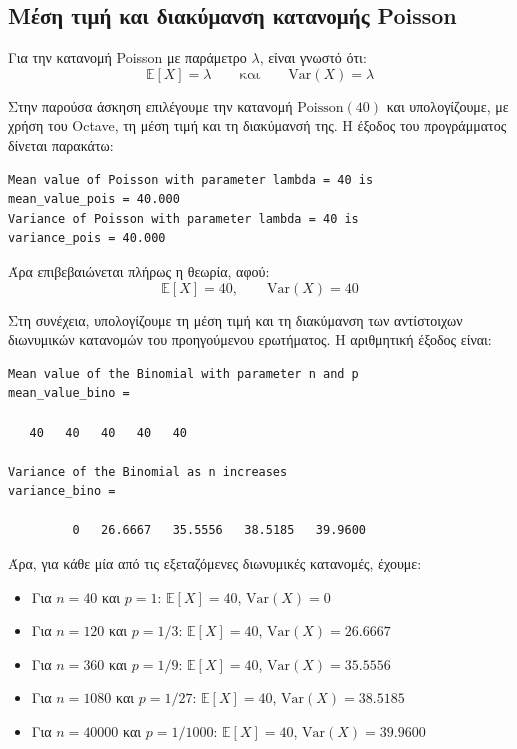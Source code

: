 \documentclass{article}
\begin{document}
\subsection{Μέση τιμή και διακύμανση κατανομής Poisson}

Για την κατανομή Poisson με παράμετρο \(\lambda\), είναι γνωστό ότι:
\begin{equation}
    \mathbb{E}[X] = \lambda
    \qquad \text{και} \qquad
    \mathrm{Var}(X) = \lambda
\end{equation}

Στην παρούσα άσκηση επιλέγουμε την κατανομή \(\mathrm{Poisson}(40)\) και υπολογίζουμε, με
χρήση του Octave, τη μέση τιμή και τη διακύμανσή της. Η έξοδος του προγράμματος δίνεται
παρακάτω:

\begin{verbatim}
Mean value of Poisson with parameter lambda = 40 is
mean_value_pois = 40.000
Variance of Poisson with parameter lambda = 40 is
variance_pois = 40.000
\end{verbatim}

Άρα επιβεβαιώνεται πλήρως η θεωρία, αφού:
\[
\mathbb{E}[X] = 40,
\qquad
\mathrm{Var}(X) = 40
\]

Στη συνέχεια, υπολογίζουμε τη μέση τιμή και τη διακύμανση των αντίστοιχων διωνυμικών
κατανομών του προηγούμενου ερωτήματος. Η αριθμητική έξοδος είναι:

\begin{verbatim}
Mean value of the Binomial with parameter n and p
mean_value_bino =

   40   40   40   40   40

Variance of the Binomial as n increases
variance_bino =

         0   26.6667   35.5556   38.5185   39.9600
\end{verbatim}

Άρα, για κάθε μία από τις εξεταζόμενες διωνυμικές κατανομές, έχουμε:
\begin{itemize}
    \item Για \(n = 40\) και \(p = 1\): \(\mathbb{E}[X] = 40\), \(\mathrm{Var}(X) = 0\)
    \item Για \(n = 120\) και \(p = 1/3\): \(\mathbb{E}[X] = 40\), \(\mathrm{Var}(X) = 26.6667\)
    \item Για \(n = 360\) και \(p = 1/9\): \(\mathbb{E}[X] = 40\), \(\mathrm{Var}(X) = 35.5556\)
    \item Για \(n = 1080\) και \(p = 1/27\): \(\mathbb{E}[X] = 40\), \(\mathrm{Var}(X) = 38.5185\)
    \item Για \(n = 40000\) και \(p = 1/1000\): \(\mathbb{E}[X] = 40\), \(\mathrm{Var}(X) = 39.9600\)
\end{itemize}
\end{document}

